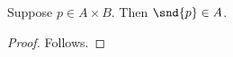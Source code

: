 

\begin{classification}\label{notion_second_projection_wrong_endpoint}
    Suppose $p\in A\times B$.
    Then $\snd{p}\in A$.
\end{classification}
\begin{proof}
    Follows.
\end{proof}
